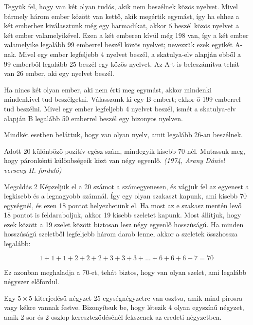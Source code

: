 \begin{solution}
	Tegyük fel, hogy van két olyan tudós, akik nem beszélnek közös nyelvet.
	Mivel bármely három ember között van kettő, akik megértik egymást,
	így ha ehhez a két emberhez kiválasztunk még egy harmadikat, akkor
	ő beszél közös nyelvet a két ember valamelyikével. Ezen a két emberen
	kívül még 198 van, így a két ember valamelyike legalább 99 emberrel
	beszél közös nyelvet; nevezzük ezek egyikét A-nak. Mivel egy ember
	legfeljebb 4 nyelvet beszél, a skatulya-elv alapján ebből a 99 emberből
	legalább 25 beszél egy közös nyelvet. Az A-t is beleszámítva tehát
	van 26 ember, aki egy nyelvet beszél.
	
	Ha nincs két olyan ember, aki nem érti meg egymást, akkor mindenki
	mindenkivel tud beszélgetni. Válasszunk ki egy B embert; ekkor ő 199
	emberrel tud beszélni. Mivel egy ember legfeljebb 4 nyelvet beszél,
	ismét a skatulya-elv alapján B legalább 50 emberrel beszél egy bizonyos
	nyelven.
	
	Mindkét esetben beláttuk, hogy van olyan nyelv, amit legalább 26-an
	beszélnek. 
\end{solution}
\begin{extraproblem}
	Adott 20 különböző pozitív egész szám, mindegyik kisebb 70-nél. Mutassuk
	meg, hogy páronkénti különbségeik közt van négy egyenlő. \emph{(1974,
		Arany Dániel verseny II. forduló) }
\end{extraproblem}

\begin{solution}
	Megoldás 2 Képzeljük el a 20 számot a számegyenesen, és vágjuk fel
	az egyenest a legkisebb és a legnagyobb számnál. Így egy olyan szakaszt
	kapunk, ami kisebb 70 egységnél, és ezen 18 pontot helyezhetünk el.
	Ha most az e szakasz mentén levő 18 pontot is feldaraboljuk, akkor
	19 kisebb szeletet kapunk. Most állítjuk, hogy ezek között a 19 szelet
	között biztosan lesz négy egyenlő hosszúságú. Ha minden hosszúságú
	szeletből legfeljebb három darab lenne, akkor a szeletek összhossza
	legalább:
	
	\[
	1+1+1+2+2+2+3+3+3+\dots+6+6+6+7=70
	\]
	
	Ez azonban meghaladja a 70-et, tehát biztos, hogy van olyan szelet,
	ami legalább négyszer előfordul. 
\end{solution}
\begin{extraproblem}
	Egy $5\times5$ kiterjedésű négyzet 25 egységnégyzetre van osztva,
	amik mind pirosra vagy kékre vannak festve. Bizonyítsuk be, hogy létezik
	4 olyan egyszínű négyzet, amik 2 sor és 2 oszlop kereszteződésénél
	fekszenek az eredeti négyzetben.
\end{extraproblem}

